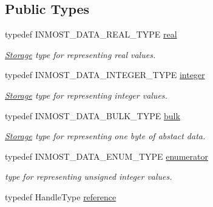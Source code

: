 \subsection*{Public Types}
\begin{DoxyCompactItemize}
\item 
\hypertarget{classINMOST_1_1Storage_a853346784b4a5822a7fac54d8f10f805}{typedef I\-N\-M\-O\-S\-T\-\_\-\-D\-A\-T\-A\-\_\-\-R\-E\-A\-L\-\_\-\-T\-Y\-P\-E \hyperlink{classINMOST_1_1Storage_a853346784b4a5822a7fac54d8f10f805}{real}}\label{classINMOST_1_1Storage_a853346784b4a5822a7fac54d8f10f805}

\begin{DoxyCompactList}\small\item\em \hyperlink{classINMOST_1_1Storage}{Storage} type for representing real values. \end{DoxyCompactList}\item 
\hypertarget{classINMOST_1_1Storage_aec96942bc647417a801e2895b45964d2}{typedef I\-N\-M\-O\-S\-T\-\_\-\-D\-A\-T\-A\-\_\-\-I\-N\-T\-E\-G\-E\-R\-\_\-\-T\-Y\-P\-E \hyperlink{classINMOST_1_1Storage_aec96942bc647417a801e2895b45964d2}{integer}}\label{classINMOST_1_1Storage_aec96942bc647417a801e2895b45964d2}

\begin{DoxyCompactList}\small\item\em \hyperlink{classINMOST_1_1Storage}{Storage} type for representing integer values. \end{DoxyCompactList}\item 
\hypertarget{classINMOST_1_1Storage_ae429556af77094077d212e0ac23c8cfc}{typedef I\-N\-M\-O\-S\-T\-\_\-\-D\-A\-T\-A\-\_\-\-B\-U\-L\-K\-\_\-\-T\-Y\-P\-E \hyperlink{classINMOST_1_1Storage_ae429556af77094077d212e0ac23c8cfc}{bulk}}\label{classINMOST_1_1Storage_ae429556af77094077d212e0ac23c8cfc}

\begin{DoxyCompactList}\small\item\em \hyperlink{classINMOST_1_1Storage}{Storage} type for representing one byte of abstact data. \end{DoxyCompactList}\item 
\hypertarget{classINMOST_1_1Storage_ae333dfced6fa9cfde0c8e7dcf1b0cc2b}{typedef I\-N\-M\-O\-S\-T\-\_\-\-D\-A\-T\-A\-\_\-\-E\-N\-U\-M\-\_\-\-T\-Y\-P\-E \hyperlink{classINMOST_1_1Storage_ae333dfced6fa9cfde0c8e7dcf1b0cc2b}{enumerator}}\label{classINMOST_1_1Storage_ae333dfced6fa9cfde0c8e7dcf1b0cc2b}

\begin{DoxyCompactList}\small\item\em type for representing unsigned integer values. \end{DoxyCompactList}\item 
\hypertarget{classINMOST_1_1Storage_a8674802045ec170a3c9d0e3281545b54}{typedef Handle\-Type \hyperlink{classINMOST_1_1Storage_a8674802045ec170a3c9d0e3281545b54}{reference}}\label{classINMOST_1_1Storage_a8674802045ec170a3c9d0e3281545b54}


\end{DoxyCompactItemize}
